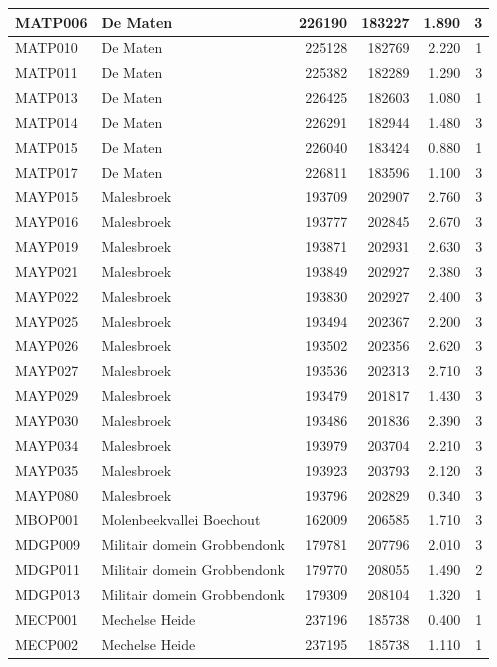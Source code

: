 \documentclass[11pt,]{book}
\begin{document}
\begin{table}
\begin{tabular}[t]{l|l|r|r|r|r}
\hline
MATP006 & De Maten & 226190 & 183227 & 1.890 & 3\\
\hline
MATP010 & De Maten & 225128 & 182769 & 2.220 & 1\\
\hline
MATP011 & De Maten & 225382 & 182289 & 1.290 & 3\\
\hline
MATP013 & De Maten & 226425 & 182603 & 1.080 & 1\\
\hline
MATP014 & De Maten & 226291 & 182944 & 1.480 & 3\\
\hline
MATP015 & De Maten & 226040 & 183424 & 0.880 & 1\\
\hline
MATP017 & De Maten & 226811 & 183596 & 1.100 & 3\\
\hline
MAYP015 & Malesbroek & 193709 & 202907 & 2.760 & 3\\
\hline
MAYP016 & Malesbroek & 193777 & 202845 & 2.670 & 3\\
\hline
MAYP019 & Malesbroek & 193871 & 202931 & 2.630 & 3\\
\hline
MAYP021 & Malesbroek & 193849 & 202927 & 2.380 & 3\\
\hline
MAYP022 & Malesbroek & 193830 & 202927 & 2.400 & 3\\
\hline
MAYP025 & Malesbroek & 193494 & 202367 & 2.200 & 3\\
\hline
MAYP026 & Malesbroek & 193502 & 202356 & 2.620 & 3\\
\hline
MAYP027 & Malesbroek & 193536 & 202313 & 2.710 & 3\\
\hline
MAYP029 & Malesbroek & 193479 & 201817 & 1.430 & 3\\
\hline
MAYP030 & Malesbroek & 193486 & 201836 & 2.390 & 3\\
\hline
MAYP034 & Malesbroek & 193979 & 203704 & 2.210 & 3\\
\hline
MAYP035 & Malesbroek & 193923 & 203793 & 2.120 & 3\\
\hline
MAYP080 & Malesbroek & 193796 & 202829 & 0.340 & 3\\
\hline
MBOP001 & Molenbeekvallei Boechout & 162009 & 206585 & 1.710 & 3\\
\hline
MDGP009 & Militair domein Grobbendonk & 179781 & 207796 & 2.010 & 3\\
\hline
MDGP011 & Militair domein Grobbendonk & 179770 & 208055 & 1.490 & 2\\
\hline
MDGP013 & Militair domein Grobbendonk & 179309 & 208104 & 1.320 & 1\\
\hline
MECP001 & Mechelse Heide & 237196 & 185738 & 0.400 & 1\\
\hline
MECP002 & Mechelse Heide & 237195 & 185738 & 1.110 & 1\\

\end{tabular}
\end{table}
\end{document}
